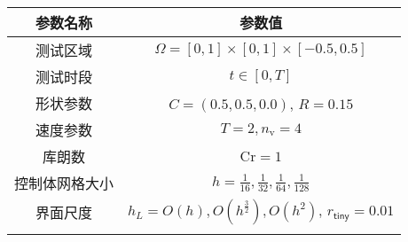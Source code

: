    \begin{tabular}{c|c}
      \hline
      参数名称 & 参数值  \\
      \hline
      测试区域     & $\Omega=[0,1]\times[0,1]\times[-0.5,0.5]$ \\
      测试时段 & $t\in[0,T]$ \\
      形状参数  & $C=(0.5,0.5,0.0)$, $R=0.15$ \\
      速度参数    & $T = 2,n_{\mathrm{v}}=4$  \\
      库朗数 & $\text{Cr}=1$               \\
      控制体网格大小
      & $h = \frac{1}{16}, \frac{1}{32},\frac{1}{64},\frac{1}{128}$  \\
      界面尺度
      & $h_L= O(h), O(h^{\frac{3}{2}}), O(h^2)$, $r_{\mathsf{tiny}}=0.01$
      \\
      \hline
      \multicolumn{2}{c}{}\\
    \end{tabular}


